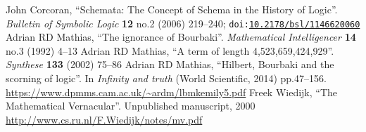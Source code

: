 \documentclass{amsart}
\begin{document}
\begin{thebibliography}{99}
  John Corcoran,
  ``Schemata: The Concept of Schema in the History of Logic''.
  \textit{Bulletin of Symbolic Logic} \textbf{12} no.2 (2006) 219--240;
  \texttt{doi:\href{https://doi.org/10.2178/bsl/1146620060}{10.2178/bsl/1146620060}}
  Adrian RD Mathias,
  ``The ignorance of Bourbaki''.
  \textit{Mathematical Intelligencer} \textbf{14} no.3 (1992) 4--13
  Adrian RD Mathias,
  ``A term of length 4,523,659,424,929''.
  \textit{Synthese} \textbf{133} (2002) 75--86
  Adrian RD Mathias,
  ``Hilbert, Bourbaki and the scorning of logic''.
  In \textit{Infinity and truth} (World Scientific, 2014) pp.47--156.
  \url{https://www.dpmms.cam.ac.uk/~ardm/lbmkemily5.pdf}
  Freek Wiedijk,
  ``The Mathematical Vernacular''.
  Unpublished manuscript, 2000
  \url{http://www.cs.ru.nl/F.Wiedijk/notes/mv.pdf}
\end{thebibliography}
\end{document}
